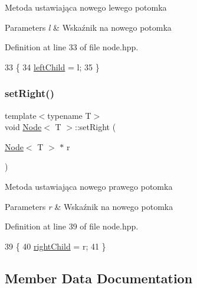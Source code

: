 Metoda ustawiająca nowego lewego potomka 
\begin{DoxyParams}{Parameters}
{\em l} & Wskaźnik na nowego potomka \\
\hline
\end{DoxyParams}


Definition at line 33 of file node.\+hpp.


\begin{DoxyCode}
33                                  \{
34             \hyperlink{classNode_a2eaaeffaeef97da6291b788fa131c9ec}{leftChild} = l;
35         \}
\end{DoxyCode}
\mbox{\label{classNode_ad5c1f634547b3e2d03c3d55d355c0c17}} 
\subsubsection{\texorpdfstring{set\+Right()}{setRight()}}
{\footnotesize\ttfamily template$<$typename T$>$ \\
void \hyperlink{classNode}{Node}$<$ T $>$\+::set\+Right (\begin{DoxyParamCaption}\item[{\hyperlink{classNode}{Node}$<$ T $>$ $\ast$}]{r }\end{DoxyParamCaption})\hspace{0.3cm}{\ttfamily [inline]}}

Metoda ustawiająca nowego prawego potomka 
\begin{DoxyParams}{Parameters}
{\em r} & Wskaźnik na nowego potomka \\
\hline
\end{DoxyParams}


Definition at line 39 of file node.\+hpp.


\begin{DoxyCode}
39                                   \{
40             \hyperlink{classNode_a625cff56d169157a568afaedbb11576b}{rightChild} = r;
41         \}
\end{DoxyCode}


\subsection{Member Data Documentation}
\mbox{\label{classNode_a9d5e5c1914f5ed67389740354a607527}} 
